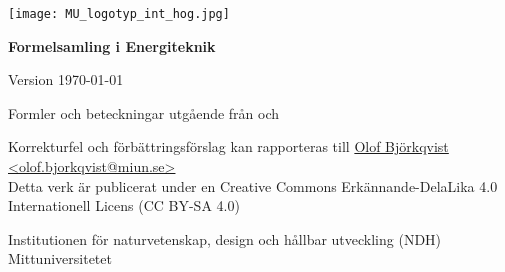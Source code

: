 \begin{titlepage}
    \begin{center}
        \texttt{[image: MU\_logotyp\_int\_hog.jpg]}
        \vspace*{4cm}
            
        \Huge
        \textbf{Formelsamling i Energiteknik} \par
            
        \Large
        \renewcommand{\dateseparator}{-}
        Version \today
            
        \vspace{2,5cm}
            
            
        
        \vfill
            
		\normalsize
		Formler och beteckningar utgående från \cite{soleimani_mohseni_formelsamling_2018} och \cite{alvarez_energiteknik_2006} \par
		\tiny
		Korrekturfel och förbättringsförslag kan rapporteras till \href{mailto:olof.bjorkqvist@miun.se}{Olof Björkqvist <olof.bjorkqvist@miun.se>} \\
		Detta verk är publicerat under en Creative Commons Erkännande-DelaLika 4.0 Internationell Licens  (CC BY-SA 4.0)

            
        \Large
        Institutionen för naturvetenskap, design och hållbar utveckling (NDH)\\
        Mittuniversitetet\\
            
    \end{center}
\end{titlepage}
